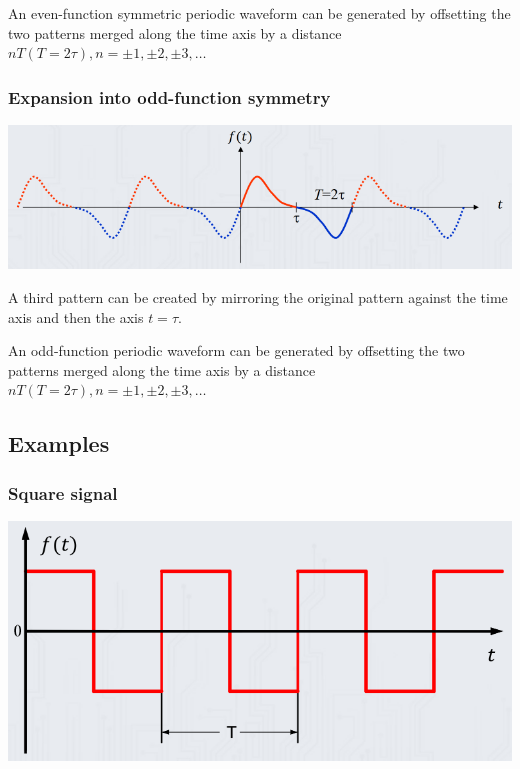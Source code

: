 \documentclass[11pt]{article}
\begin{document}
An even-function symmetric periodic waveform can be generated by offsetting the two patterns merged along the time axis by a distance \(nT (T = 2 \tau), n = \pm 1, \pm 2, \pm 3, \ldots\)
\subsubsection{Expansion into odd-function symmetry}
\label{sec:org7f83d68}
\begin{center}
\includegraphics[width=.9\linewidth]{./images/odd-function-symmetry-repeated-pattern.png}
\end{center}
A third pattern can be created by mirroring the original pattern against the time axis and then the axis \(t = \tau\).

An odd-function periodic waveform can be generated by offsetting the two patterns merged along the time axis by a distance \(nT (T = 2 \tau), n = \pm 1, \pm 2, \pm 3, \ldots\)
\subsection{Examples}
\label{sec:org4531f5f}

\subsubsection{Square signal}
\label{sec:org2a8fb23}
\begin{center}
\includegraphics[width=.9\linewidth]{./images/square-signal.png}
\end{center}
\end{document}
